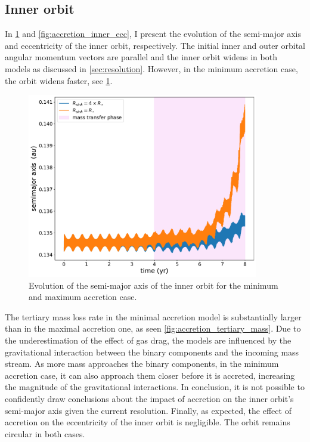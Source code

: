 \subsection{Inner orbit}

In \cref{fig:accretion_inner_semimajor_axis} and \cref{fig:accretion_inner_ecc}, I present the evolution of the semi-major axis and eccentricity of the inner orbit, 
respectively. The initial inner and outer orbital angular momentum vectors are parallel and the inner orbit widens in both models as discussed in \cref{sec:resolution}. However, in the minimum accretion case, the orbit widens faster, see \cref{fig:accretion_inner_semimajor_axis}.
\begin{figure}[H]
    \centering
    \includegraphics[width=0.9\textwidth]{Thesis/graphs/accretion_case/accretion_inner_semimajor_axis.pdf}
    \caption{Evolution of the semi-major axis of the inner orbit for the minimum and maximum accretion case.}
    \label{fig:accretion_inner_semimajor_axis}
\end{figure} 
The tertiary mass loss rate in the minimal accretion model is substantially larger than in the maximal accretion one, as seen \cref{fig:accretion_tertiary_mass}. Due to the underestimation of the effect of gas drag, the models are influenced by the gravitational interaction between the binary components and the incoming mass stream. As more mass approaches the binary components, in the minimum accretion case, it can also approach them closer before it is accreted, increasing the magnitude of the gravitational interactions. In conclusion, it is not possible to confidently draw conclusions about the impact of accretion on the inner orbit's semi-major axis given the current resolution. Finally, as expected, the effect of accretion on the eccentricity of the inner orbit is negligible. The orbit remains circular in both cases.
